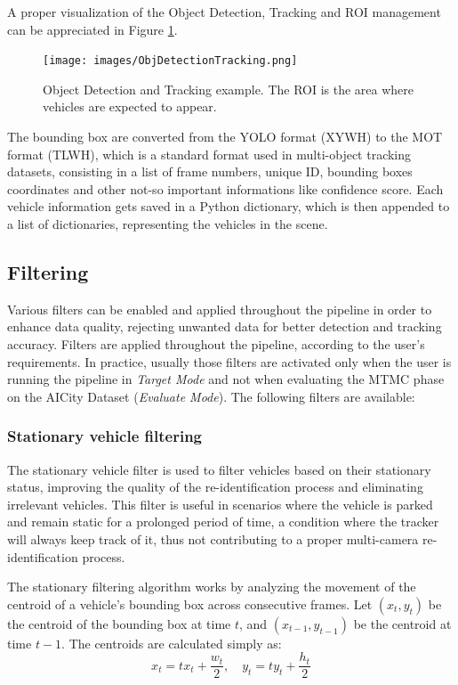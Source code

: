 A proper visualization of the Object Detection, Tracking and ROI management can be appreciated in Figure \ref{fig:ObjDetectionTracking}.

\begin{figure}[H]
    \centering
    \texttt{[image: images/ObjDetectionTracking.png]}
    \caption[Object Detection and Tracking example]{Object Detection and Tracking example. The ROI is the area where vehicles are expected to appear.}
    \label{fig:ObjDetectionTracking}
\end{figure}

The bounding box are converted from the YOLO format (XYWH) to the MOT format (TLWH), which is a standard format used in multi-object tracking datasets, consisting in a list of frame numbers, unique ID, bounding boxes coordinates and other not-so important informations like confidence score. Each vehicle information gets saved in a Python dictionary, which is then appended to a list of dictionaries, representing the vehicles in the scene.

\subsection{Filtering}
\label{subsec:Filtering}
Various filters can be enabled and applied throughout the pipeline in order to enhance data quality, rejecting unwanted data for better detection and tracking accuracy. Filters are applied throughout the pipeline, according to the user's requirements. In practice, usually those filters are activated only when the user is running the pipeline in \textit{Target Mode} and not when evaluating the MTMC phase on the AICity Dataset (\textit{Evaluate Mode}). The following filters are available:

\subsubsection{Stationary vehicle filtering}
The stationary vehicle filter is used to filter vehicles based on their stationary status, improving the quality of the re-identification process and eliminating irrelevant vehicles. This filter is useful in scenarios where the vehicle is parked and remain static for a prolonged period of time, a condition where the tracker will always keep track of it, thus not contributing to a proper multi-camera re-identification process.

The stationary filtering algorithm works by analyzing the movement of the centroid of a vehicle's bounding box across consecutive frames. Let $(x_{t}, y_{t})$ be the centroid of the bounding box at time $t$, and $(x_{t-1}, y_{t-1})$ be the centroid at time $t-1$. The centroids are calculated simply as:
\[
    x_t = tx_t + \frac{w_t}{2}, \quad y_t = ty_t + \frac{h_t}{2}
\]

